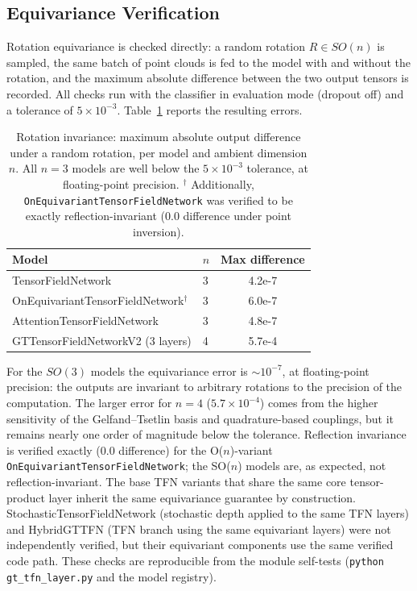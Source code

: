 \documentclass[a4paper,11pt]{article}
\begin{document}
\subsection{Equivariance Verification} \label{sec:equiv_verif}

Rotation equivariance is checked directly: a random rotation $R\in SO(n)$ is sampled, the same batch of point clouds is fed to the model with and without the rotation, and the maximum absolute difference between the two output tensors is recorded.
All checks run with the classifier in evaluation mode (dropout off) and a tolerance of $5\times10^{-3}$.
Table~\ref{tab:equiv} reports the resulting errors.
\begin{table}[ht]
\centering
\caption{Rotation invariance: maximum absolute output difference under a random rotation, per model and ambient dimension $n$. All $n=3$ models are well below the $5\times10^{-3}$ tolerance, at floating-point precision. $^\dagger$ Additionally, \texttt{OnEquivariantTensorFieldNetwork} was verified to be exactly reflection-invariant ($0.0$ difference under point inversion).}
\label{tab:equiv}
\small
\begin{tabular}{llc}
\toprule
Model & $n$ & Max difference \\
\midrule
TensorFieldNetwork & 3 & 4.2e-7 \\
OnEquivariantTensorFieldNetwork$^\dagger$ & 3 & 6.0e-7 \\
AttentionTensorFieldNetwork & 3 & 4.8e-7 \\
GTTensorFieldNetworkV2 (3 layers) & 4 & 5.7e-4 \\
\bottomrule
\end{tabular}
\end{table}

For the $SO(3)$ models the equivariance error is ${\sim}10^{-7}$, at floating-point precision: the outputs are invariant to arbitrary rotations to the precision of the computation.
The larger error for $n=4$ ($5.7\times10^{-4}$) comes from the higher sensitivity of the Gelfand--Tsetlin basis and quadrature-based couplings, but it remains nearly one order of magnitude below the tolerance.
Reflection invariance is verified exactly ($0.0$ difference) for the O($n$)-variant \texttt{OnEquivariantTensorFieldNetwork}; the SO($n$) models are, as expected, not reflection-invariant.
The base TFN variants that share the same core tensor-product layer inherit the same equivariance guarantee by construction.
StochasticTensorFieldNetwork (stochastic depth applied to the same TFN layers) and HybridGTTFN (TFN branch using the same equivariant layers) were not independently verified, but their equivariant components use the same verified code path.
These checks are reproducible from the module self-tests (\texttt{python gt\_tfn\_layer.py} and the model registry).
\end{document}
